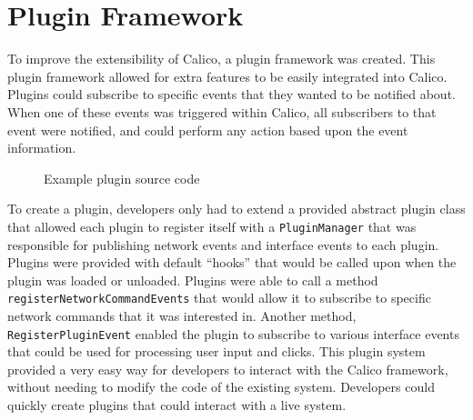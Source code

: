\section{Plugin Framework}
To improve the extensibility of Calico, a plugin framework was created. This plugin framework allowed for extra features to be easily integrated into Calico. Plugins could subscribe to specific events that they wanted to be notified about. When one of these events was triggered within Calico, all subscribers to that event were notified, and could perform any action based upon the event information. 

\begin{figure}[htb]
  \centering
  \small
  
  \normalsize
  \caption{Example plugin source code}
  \label{fig:plugin_file}
\end{figure}

To create a plugin, developers only had to extend a provided abstract plugin class that allowed each plugin to register itself with a \texttt{PluginManager} that was responsible for publishing network events and interface events to each plugin. Plugins were provided with default ``hooks'' that would be called upon when the plugin was loaded or unloaded. Plugins were able to call a method \texttt{registerNetworkCommandEvents} that would allow it to subscribe to specific network commands that it was interested in. Another method, \texttt{RegisterPluginEvent} enabled the plugin to subscribe to various interface events that could be used for processing user input and clicks. This plugin system provided a very easy way for developers to interact with the Calico framework, without needing to modify the code of the existing system. Developers could quickly create plugins that could interact with a live system.
